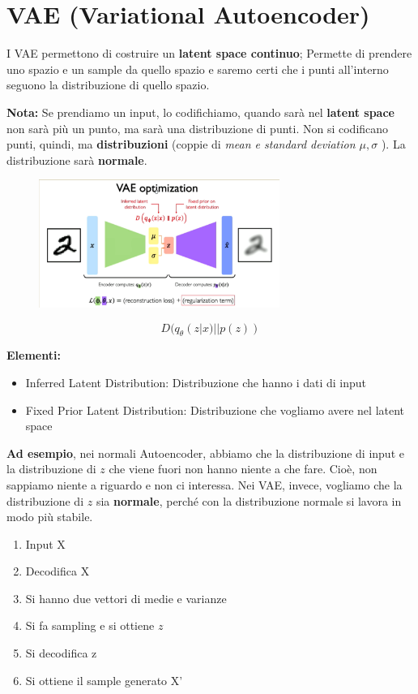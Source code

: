\section{VAE (Variational Autoencoder)}

I VAE permettono di costruire un \textbf{latent space continuo}; Permette di
prendere uno spazio e un sample da quello spazio e saremo certi che i punti
all'interno seguono la distribuzione di quello spazio.

\textbf{Nota:} Se prendiamo un input, lo codifichiamo, quando sarà nel \textbf{latent space} non sarà più un punto,
ma sarà una distribuzione di punti. Non si codificano punti, quindi, ma \textbf{distribuzioni} (coppie di \textit{mean e standard deviation $\mu, \sigma$
}). La distribuzione sarà \textbf{normale}.

\begin{figure}[H]
    \centering
    \includegraphics[width=0.7\textwidth]{images/vae.png}
\end{figure}

\begin{equation}
    D(q_\theta(z|x)||p(z))
\end{equation}

\textbf{Elementi:}
\begin{itemize}
    \item Inferred Latent Distribution: Distribuzione che hanno i dati di input
    \item Fixed Prior Latent Distribution: Distribuzione che vogliamo avere nel latent
          space
\end{itemize}

\textbf{Ad esempio}, nei normali Autoencoder, abbiamo che la distribuzione di input e la distribuzione di $z$ che viene fuori
non hanno niente a che fare. Cioè, non sappiamo niente a riguardo e non ci interessa.
Nei VAE, invece, vogliamo che la distribuzione di $z$ sia \textbf{normale}, perché con la distribuzione normale
si lavora in modo più stabile.

\begin{enumerate}
    \item Input X
    \item Decodifica X
    \item Si hanno due vettori di medie e varianze
    \item Si fa sampling e si ottiene $z$
    \item Si decodifica z
    \item Si ottiene il sample generato X'
\end{enumerate}

